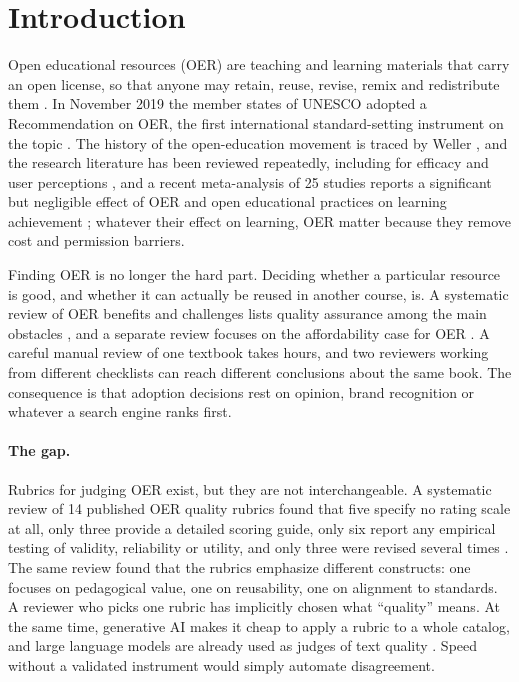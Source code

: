 \section{Introduction}
\label{sec:intro}

Open educational resources (OER) are teaching and learning materials that carry an open license, so that anyone may retain, reuse, revise, remix and redistribute them \cite{wiley5r,wiley2018}. In November 2019 the member states of UNESCO adopted a Recommendation on OER, the first international standard-setting instrument on the topic \cite{unesco2019}. The history of the open-education movement is traced by Weller \cite{weller2014}, and the research literature has been reviewed repeatedly, including for efficacy and user perceptions \cite{wiley2014,hilton2016,hilton2020}, and a recent meta-analysis of 25 studies reports a significant but negligible effect of OER and open educational practices on learning achievement \cite{tlili2023}; whatever their effect on learning, OER matter because they remove cost and permission barriers.

Finding OER is no longer the hard part. Deciding whether a particular resource is good, and whether it can actually be reused in another course, is. A systematic review of OER benefits and challenges lists quality assurance among the main obstacles \cite{adil2022}, and a separate review focuses on the affordability case for OER \cite{mullens2023}. A careful manual review of one textbook takes hours, and two reviewers working from different checklists can reach different conclusions about the same book. The consequence is that adoption decisions rest on opinion, brand recognition or whatever a search engine ranks first.

\paragraph{The gap.}
Rubrics for judging OER exist, but they are not interchangeable. A systematic review of 14 published OER quality rubrics found that five specify no rating scale at all, only three provide a detailed scoring guide, only six report any empirical testing of validity, reliability or utility, and only three were revised several times \cite{yuan2015}. The same review found that the rubrics emphasize different constructs: one focuses on pedagogical value, one on reusability, one on alignment to standards. A reviewer who picks one rubric has implicitly chosen what ``quality'' means. At the same time, generative AI makes it cheap to apply a rubric to a whole catalog, and large language models are already used as judges of text quality \cite{zheng2023,gu2024}. Speed without a validated instrument would simply automate disagreement.

